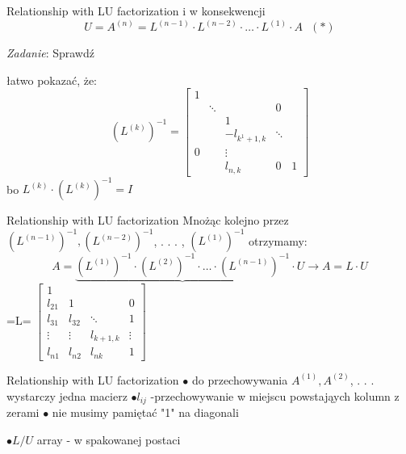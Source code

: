 \begin{frame}{Relationship with LU factorization}
i w konsekwencji
$$
U=A^{(n)}=L^{(n-1)}\cdot L^{(n-2)}\cdot\ldots\cdot L^{(1)}\cdot A \ \ \ (*)
$$
\begin{flushright}
{\it Zadanie}: Sprawdź
\end{flushright}
łatwo pokazać, że:
$$
(L^{(k)})^{-1}=\begin{bmatrix}
1 \\
 & \ddots & & 0 \\
 & & 1\\
 & &   -l_{k^{1}+1,k}  & \ddots\\
 0 & &  \vdots \\
 & & l_{n,k} &  0  & 1

\end{bmatrix}
$$
bo $L^{(k)}\cdot(L^{(k)})^{-1}=I$
\end{frame}
\begin{frame}{Relationship with LU factorization}
Mnożąc kolejno przez $(L^{(n-1)})^{-1}, (L^{(n-2)})^{-1}$, . . . , $(L^{(1)})^{-1}$ otrzymamy:
$$
A=\underbrace{(L^{(1)})^{-1}\cdot(L^{(2)})^{-1}\cdot\ldots\cdot(L^{(n-1)})^{-1}}\cdot U\rightarrow A=L\cdot U
$$
\hspace{17mm}
=L=
$
\begin{bmatrix}
1 & & & \\
l_{21}  & 1 & & 0 \\
l_{31} & l_{32} & \ddots & 1 \\
\vdots & \vdots & l_{k+1,k} & \vdots \\
l_{n1} & l_{n2} & l_{nk} & 1
\end{bmatrix}
$
\end{frame}
\begin{frame}{Relationship with LU factorization}
$\bullet$ do przechowywania $A^{(1)}, A^{(2)}$, . . . wystarczy jedna macierz \newline
$\bullet l_{ij}$ -przechowywanie w miejscu powstająych kolumn z zerami \newline
$\bullet$ nie musimy pamiętać "1" na diagonali

$\bullet L/U$ array - w spakowanej postaci
\end{frame}